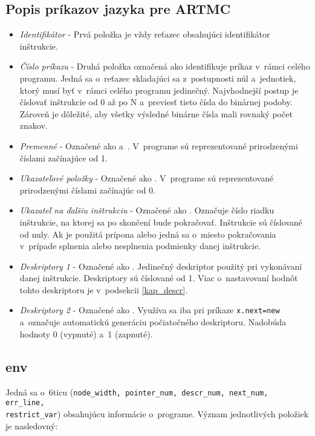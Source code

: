 \subsection{Popis príkazov jazyka pre ARTMC}
\begin{itemize}
    \item \textit{Identifikátor} - Prvá položka je vždy reťazec obsahujúci identifikátor inštrukcie.
    \item \textit{Číslo príkazu} - Druhá položka označená ako  identifikuje príkaz
        v~rámci celého programu. Jedná sa o~reťazec skladajúci sa z~postupnosti
        núl a~jednotiek, ktorý musí byť v~rámci celého  programu jedinečný.
        Najvhodnejší postup je číslovať inštrukcie od 0 až po N a~previesť tieto
        čísla do binárnej podoby. Zároveň je dôležité, aby všetky výsledné binárne čísla mali rovnaký počet znakov.
    \item \textit{Premenné} - Označené ako  a~. V~programe sú reprezentované prirodzenými číslami začínajúce od 1.
    \item \textit{Ukazateľové položky} - Označené ako . V~programe sú reprezentované prirodzenými číslami začínajúc od 0.
    \item \textit{Ukazateľ na ďalšiu inštrukciu} - Označené ako . Označuje
        číslo riadku inštrukcie, na ktorej sa po skončení bude pokračovať. Inštrukcie
        sú číslované od nuly. Ak je použitá prípona  alebo 
        jedná sa o~miesto pokračovania v~prípade splnenia alebo nesplnenia podmienky danej inštrukcie.
    \item \textit{Deskriptory 1} - Označené ako . Jedinečný deskriptor použitý pri vykonávaní danej inštrukcie. Deskriptory sú číslované od 1. Viac o~nastavovaní hodnôt tohto deskriptoru je v~podsekcii \ref{kap_descr}.
    \item \textit{Deskriptory 2} - Označené ako . Využíva sa iba pri príkaze \texttt{x.next=new} a~označuje automatickú generáciu počiatočného deskriptoru. Nadobúda hodnoty 0 (vypnuté) a~1 (zapnuté).
\end{itemize}

\subsection{env}
Jedná sa o~6ticu (\texttt{node\_width, pointer\_num, descr\_num, next\_num, err\_line,\\ restrict\_var}) obsahujúcu informácie o~programe.
Význam jednotlivých položiek je nasledovný:

